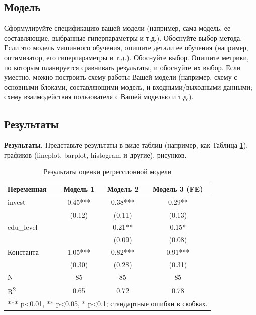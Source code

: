 \documentclass[a4paper,12pt]{article}
\begin{document}
\subsection{Модель}
Сформулируйте спецификацию вашей модели (например, сама модель, ее составляющие, выбранные гиперпараметры и т.д.). Обоснуйте выбор метода. Если это модель машинного обучения, опишите детали ее обучения (например, оптимизатор, его гиперпараметры и т.д.). Обоснуйте выбор. Опишите метрики, по которым планируется сравнивать результаты, и обоснуйте их выбор. Если уместно, можно построить схему работы Вашей модели (например, схему с основными блоками, составляющими модель, и входными/выходными данными; схему взаимодействия пользователя с Вашей моделью и т.д.).


\subsection{Результаты}

\textbf{Результаты.} Представьте результаты в виде таблиц (например, как Таблица \ref{tab:regression}), графиков (lineplot, barplot, histogram и другие), рисунков.

\begin{table}[H]
    \centering
    \caption{Результаты оценки регрессионной модели}
    \label{tab:regression}
    \begin{tabular}{lccc}
        \toprule
        \textbf{Переменная}  & \textbf{Модель 1} & \textbf{Модель 2} & \textbf{Модель 3 (FE)} \\
        \midrule
        invest               & 0.45***           & 0.38***           & 0.29**                 \\
                             & (0.12)            & (0.11)            & (0.13)                 \\
        edu\_level           &                   & 0.21**            & 0.15*                  \\
                             &                   & (0.09)            & (0.08)                 \\
        Константа            & 1.05***           & 0.82***           & 0.91***                \\
                             & (0.30)            & (0.28)            & (0.31)                 \\
        \midrule
        N                    & 85                & 85                & 85                     \\
        R\textsuperscript{2} & 0.65              & 0.72              & 0.78                   \\
        \bottomrule
        \multicolumn{4}{l}{\footnotesize{*** p<0.01, ** p<0.05, * p<0.1; стандартные ошибки в скобках.}}
    \end{tabular}
\end{table}
\end{document}
